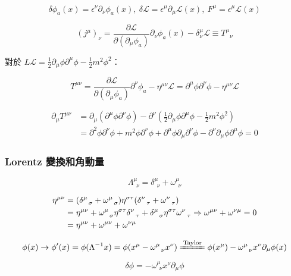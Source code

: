 \documentclass{article}
\begin{document}
$$\delta\phi_a(x)=\epsilon^{\nu}\partial_{\nu}\phi_{a}(x),\ \delta\mathcal{L}=\epsilon^{\mu}\partial_{\mu}\mathcal{L}(x),\ F^{\mu}=\epsilon^{\mu}\mathcal{L}(x)$$

$$(j^{\mu})_{\nu}=\frac{\partial\mathcal{L}}{\partial(\partial_{\mu}\phi_{a})}\partial_{\nu}\phi_{a}(x)-\delta^{\mu}_{\nu}\mathcal{L}\equiv T^{\mu}_{\ \ \ \nu}$$

對於 $L\mathcal{L}=\frac{1}{2}\partial_{\mu}\phi\partial^{\mu}\phi-\frac{1}{2}m^2\phi^2$：

$$T^{\mu\nu}=\frac{\partial\mathcal{L}}{\partial(\partial_{\mu}\phi_{a})}\partial^{\nu}\phi_{a}-\eta^{\mu\nu}\mathcal{L}=\partial^{\mu}\phi\partial^{\nu}\phi-\eta^{\mu\nu}\mathcal{L}$$

$$
\begin{aligned}
\partial_{\mu}T^{\mu\nu} & =\partial_{\mu}(\partial^{\mu}\phi\partial^{\nu}\phi)-\partial^{\nu}(\frac{1}{2}\partial_{\mu}\phi\partial^{\mu}\phi-\frac{1}{2}m^2\phi^2)                          \\
& =\partial^2\phi\partial^{\nu}\phi+m^2\phi\partial^{\nu}\phi+\partial^{\mu}\phi\partial_{\mu}\partial^{\nu}\phi-\partial^{\nu}\partial_{\mu}\phi\partial^{\mu}\phi=0
\end{aligned}$$

\subsubsection{Lorentz 變換和角動量}

$$\Lambda^{\mu}_{\ \ \nu}=\delta^{\mu}_{\ \ \nu}+\omega^{\mu}_{\ \ \nu}$$

$$
\begin{aligned}
\eta^{\mu\nu} & =(\delta^{\mu}_{\ \ \sigma}+\omega^{\mu}_{\ \ \sigma})\eta^{\sigma\tau}(\delta^{\nu}_{\ \ \tau}+\omega^{\nu}_{\ \ \tau})                           \\
& =\eta^{\mu\nu}+\omega^{\mu}_{\ \ \sigma}\eta^{\sigma\tau}\delta^{\nu}_{\ \ \tau}+\delta^{\mu}_{\ \ \sigma}\eta^{\sigma\tau}\omega^{\nu}_{\ \ \tau} \\
& =\eta^{\mu\nu}+\omega^{\mu\nu}+\omega^{\nu\mu}
\end{aligned}\\\Rightarrow\omega^{\mu\nu}+\omega^{\nu\mu}=0$$

$$\phi(x)\to\phi'(x)=\phi(\Lambda^{-1}x)=\phi(x^{\mu}-\omega^{\mu}_{\ \ \nu}x^{\nu})\xlongequal{\mathrm{Taylor}}\phi(x^{\mu})-\omega^{\mu}_{\ \ \nu}x^{\nu}\partial_{\mu}\phi(x)$$

$$\delta\phi=-\omega^{\mu}_{\ \ \nu}x^{\nu}\partial_{\mu}\phi$$
\end{document}
